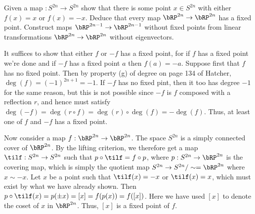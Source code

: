 \begin{homework}[e]
   Given a map $:S^{2n}\to S^{2n}$ show that there is some point $x \in S^{2n}$ with either $f(x) = x$ or $f(x) = -x$. Deduce that every map $\bRP^{2n}\to \bRP^{2n}$ has a fixed point. Construct maps $\bRP^{2n - 1}\to \bRP^{2n - 1}$ without fixed points from linear transformations $\bRP^{2n}\to \bRP^{2n}$ without eigenvectors.
  \begin{prf}
    It suffices to show that either $f$ or $-f$ has a fixed point, for if $f$ has a fixed point we're done and if $-f$ has a fixed point $a$ then $f(a) = -a$. Suppose first that $f$ has no fixed point. Then by property (g) of degree on page 134 of Hatcher, $\deg(f) = (-1)^{2n + 1} = -1$. If $-f$ has no fixed pint, then it too has degree $-1$ for the same reason, but this is not possible since $-f$ is $f$ composed with a reflection $r$, and hence must satisfy $\deg(-f) = \deg(r\circ f) = \deg(r)\circ \deg(f) = -\deg(f)$. Thus, at least one of $f$ and $-f$ has a fixed point.

    Now consider a map $f:\bRP^{2n}\to \bRP^{2n}$. The space $S^{2n}$ is a simply connected cover of $\bRP^{2n}$. By the lifting criterion, we therefore get a map $\tilf:S^{2n}\to S^{2n}$ such that $p\circ \tilf = f\circ p$, where $p:S^{2n}\to \bRP^{2n}$ is the covering map, which is simply the quotient map $S^{2n}\to S^{2n}/\sim = \bRP^{2n}$ where $x \sim -x$. Let $x$ be a point such that $\tilf(x) = - x$ or $\tilf(x) = x$, which must exist by what we have already shown. Then $p\circ \tilf(x) = p(\pm x) = [x] = f(p(x)) = f([x])$. Here we have used $[x]$ to denote the coset of $x$ in $\bRP^{2n}$. Thus, $[x]$ is a fixed point of $f$.


\end{prf}
\end{homework}
